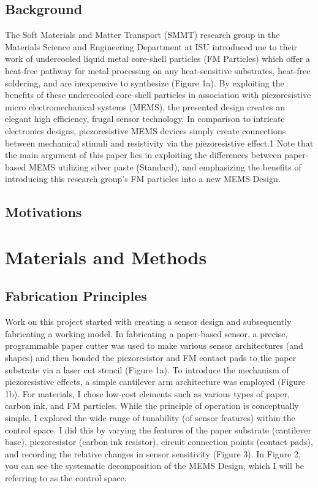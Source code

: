 \documentclass[12pt]{article}
\begin{document}
\subsection{Background}
The Soft Materials and Matter Transport (SMMT) research group in the Materials Science and Engineering Department at ISU introduced me to their work of undercooled liquid metal core-shell particles (FM Particles) which offer a heat-free pathway for metal processing on any heat-sensitive substrates, heat-free soldering, and are inexpensive to synthesize (Figure 1a). By exploiting the benefits of these undercooled core-shell particles in association with piezoresistive micro electromechanical systems (MEMS), the presented design creates an elegant high efficiency, frugal sensor technology. In comparison to intricate electronics designs, piezoresistive MEMS devices simply create connections between mechanical stimuli and resistivity via the piezoresistive effect.1 Note that the main argument of this paper lies in exploiting the differences between paper-based MEMS utilizing silver paste (Standard), and emphasizing the benefits of introducing this research group’s FM particles into a new MEMS Design.


\subsection{Motivations}



\pagebreak
\section{Materials and Methods}
  


\subsection{Fabrication Principles}
Work on this project started with creating a sensor design and subsequently fabricating a working model. In fabricating a paper-based sensor, a precise, programmable paper cutter was used to make various sensor architectures (and shapes) and then bonded the piezoresistor and FM contact pads to the paper substrate via a laser cut stencil (Figure 1a). To introduce the mechanism of piezoresistive effects, a simple cantilever arm architecture was employed (Figure 1b). For materials, I chose low-cost elements such as various types of paper, carbon ink, and FM particles. While the principle of operation is conceptually simple, I explored the wide range of tunability (of sensor features) within the control space. I did this by varying the features of the paper substrate (cantilever base), piezoresistor (carbon ink resistor), circuit connection points (contact pads), and recording the relative changes in sensor sensitivity (Figure 3). In Figure 2, you can see the systematic decomposition of the MEMS Design, which I will be referring to as the control space. 
\end{document}
